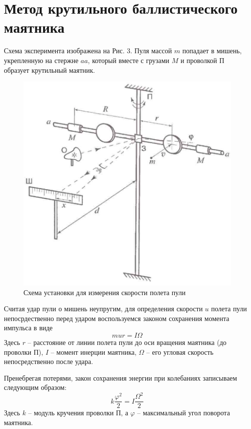 \documentclass[a4paper,12pt]{article} %
\begin{document}
\section{Метод крутильного баллистического маятника}
Схема эксперимента изображена на Рис. 3. Пуля массой $m$ попадает в мишень, укрепленную на стержне $aa$, который вместе с грузами $M$  и проволкой П образует крутильный маятник.
\begin{figure}[h]
\centering
\includegraphics[scale = 0.4]{3}
\caption{Схема установки для измерения скорости полета пули}
\end{figure}
 Считая удар пули о мишень неупругим, для определения скорости $u$ полета пули непосрдественно перед ударом воспользуемся законом сохранения момента импульса в виде
 \begin{equation}
 mur=I\Omega
 \end{equation}
 Здесь $r$ -- расстояние от линии полета пули до оси вращения маятника (до проволки П), $I$ -- момент инерции маятника, $\Omega$ -- его угловая скорость непосредственно после удара.
 
 Пренебрегая потерями, закон сохранения энергии при колебаниях записываем следующим образом:
 \begin{equation}
 k\frac{\varphi^2}{2}=I\frac{\Omega^2}{2}
 \end{equation}
 Здесь $k$ -- модуль кручения проволки П, а $\varphi$ -- максимальный угол поворота маятника.
 
\end{document}
